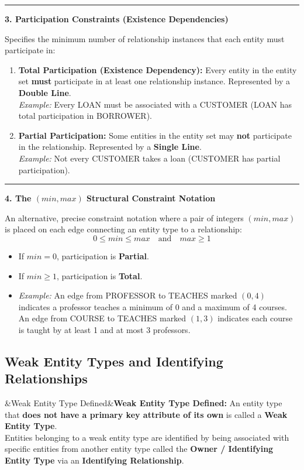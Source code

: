 \documentclass[11pt,a4paper]{article}
\newcommand{\ic}[1]{\mbox{\colorbox{AnthCodeBG}{\footnotesize\ttfamily\textcolor{AnthBlue}{#1}}}}
\newcommand{\concept}[1]{%
  \vspace{3pt}\noindent\textcolor{AnthGreen}{\rule{3.5pt}{10pt}}\enspace
  \textbf{\sffamily\color{AnthDark}#1}\par\vspace{2pt}%
}
\newenvironment{Def}[1][]{\begin{tcolorbox}[defbox]\ifx&#1&\else\textbf{\color{AnthOrange}#1:}\enspace\fi}{\end{tcolorbox}}
\begin{document}
\concept{3. Participation Constraints (Existence Dependencies)}
Specifies the minimum number of relationship instances that each entity must participate in:
\begin{enumerate}
  \item \textbf{Total Participation (Existence Dependency):} Every entity in the entity set \textbf{must} participate in at least one relationship instance. Represented by a \textbf{Double Line}.\\
  \emph{Example:} Every \ic{LOAN} must be associated with a \ic{CUSTOMER} (\ic{LOAN} has total participation in \ic{BORROWER}).
  \item \textbf{Partial Participation:} Some entities in the entity set may \textbf{not} participate in the relationship. Represented by a \textbf{Single Line}.\\
  \emph{Example:} Not every \ic{CUSTOMER} takes a loan (\ic{CUSTOMER} has partial participation).
\end{enumerate}

\concept{4. The $(min, max)$ Structural Constraint Notation}
An alternative, precise constraint notation where a pair of integers $(min, max)$ is placed on each edge connecting an entity type to a relationship:
\begin{equation}
  0 \le min \le max \quad \text{and} \quad max \ge 1
\end{equation}
\begin{itemize}
  \item If $min = 0$, participation is \textbf{Partial}.
  \item If $min \ge 1$, participation is \textbf{Total}.
  \item \emph{Example:} An edge from \ic{PROFESSOR} to \ic{TEACHES} marked $(0, 4)$ indicates a professor teaches a minimum of 0 and a maximum of 4 courses. An edge from \ic{COURSE} to \ic{TEACHES} marked $(1, 3)$ indicates each course is taught by at least 1 and at most 3 professors.
\end{itemize}

\subsection{Weak Entity Types and Identifying Relationships}

\begin{Def}[Weak Entity Type Defined]
An entity type that \textbf{does not have a primary key attribute of its own} is called a \textbf{Weak Entity Type}.\\
Entities belonging to a weak entity type are identified by being associated with specific entities from another entity type called the \textbf{Owner / Identifying Entity Type} via an \textbf{Identifying Relationship}.
\end{Def}
\end{document}
